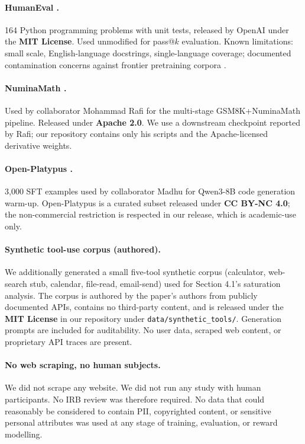 \paragraph{HumanEval \cite{chen2021codex}.}
164 Python programming problems with unit tests, released by OpenAI under
the \textbf{MIT License}. Used unmodified for pass@$k$ evaluation. Known
limitations: small scale, English-language docstrings, single-language
coverage; documented contamination concerns against frontier pretraining
corpora \cite{riddell2024contamination}.

\paragraph{NuminaMath \cite{li2024numinamath}.}
Used by collaborator Mohammad Rafi for the multi-stage
GSM8K+NuminaMath pipeline. Released under \textbf{Apache 2.0}. We use a
downstream checkpoint reported by Rafi; our repository contains only his
scripts and the Apache-licensed derivative weights.

\paragraph{Open-Platypus \cite{lee2023platypus}.}
3{,}000 SFT examples used by collaborator Madhu for Qwen3-8B code
generation warm-up. Open-Platypus is a curated subset released under
\textbf{CC BY-NC 4.0}; the non-commercial restriction is respected in our
release, which is academic-use only.

\paragraph{Synthetic tool-use corpus (authored).}
We additionally generated a small five-tool synthetic corpus (calculator,
web-search stub, calendar, file-read, email-send) used for Section 4.1's
saturation analysis. The corpus is authored by the paper's authors from
publicly documented APIs, contains no third-party content, and is
released under the \textbf{MIT License} in our repository under
\texttt{data/synthetic\_tools/}. Generation prompts are included for
auditability. No user data, scraped web content, or proprietary API
traces are present.

\paragraph{No web scraping, no human subjects.}
We did not scrape any website. We did not run any study with human
participants. No IRB review was therefore required. No data that could
reasonably be considered to contain PII, copyrighted content, or sensitive
personal attributes was used at any stage of training, evaluation, or
reward modelling.

